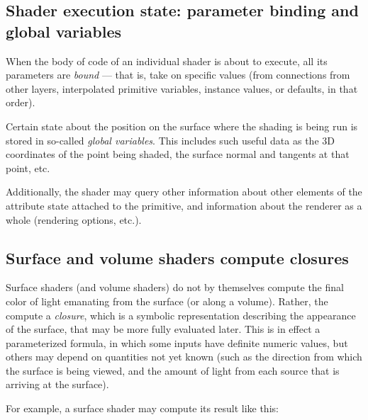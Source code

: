 \documentclass[11pt,letterpaper]{book}
\begin{document}
%

\subsection*{Shader execution state: parameter binding and global variables}

When the body of code of an individual shader is about to execute, all
its parameters are \emph{bound} --- that is, take on specific values
(from connections from other layers, interpolated primitive variables,
instance values, or defaults, in that order).

Certain state about the position on the surface where the shading is
being run is stored in so-called \emph{global variables}.  This includes
such useful data as the 3D coordinates of the point being shaded, the
surface normal and tangents at that point, etc.

Additionally, the shader may query other information about other
elements of the attribute state attached to the primitive, and
information about the renderer as a whole (rendering options, etc.).

\subsection*{Surface and volume shaders compute closures}

Surface shaders (and volume shaders) do not by themselves compute the
final color of light emanating from the surface (or along a volume).
Rather, the compute a \emph{closure}, which is a symbolic representation
describing the appearance of the surface, that may be more fully
evaluated later.  This is in effect a parameterized formula, in which
some inputs have definite numeric values, but others may depend on
quantities not yet known (such as the direction from which the surface
is being viewed, and the amount of light from each source that is
arriving at the surface).

For example, a surface shader may compute its result like this:
\end{document}
